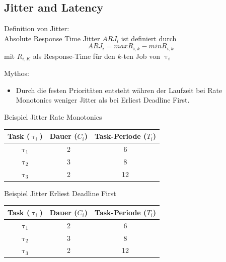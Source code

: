 

\subsection{Jitter and Latency}\label{JitterandLatency}

\begin{frame}{\subsecname}
	Definition von Jitter:\\
	Absolute Response Time Jitter $ARJ_i$ ist definiert durch
	\begin{equation}
		ARJ_i=max R_{i,k}-min R_{i,k}
	\end{equation} mit
	$R_{i,K}$ als Response-Time für den $k$-ten Job von $\uptau_i$
\end{frame}

\begin{frame}{\subsecname}
	Mythos:
	\begin{itemize}
		\item Durch die festen Prioritäten entsteht währen der Laufzeit bei Rate Monotonics weniger Jitter als bei Erliest Deadline First. 
	\end{itemize}
\end{frame}

\newcommand{\showRMSlideJit}[1] {\begin{frame}{Beispiel Jitter Rate Monotonics}
		\begin{center}
		\begin{tabular}{c||c|c}
			Task ($\uptau_i$) & Dauer ($C_i$) & Task-Periode ($T_i$)\\\hline\hline
			$\uptau_1$ & 2 & 6\\
			$\uptau_2$ & 3 & 8\\
			$\uptau_3$ & 2 & 12
		\end{tabular}
	\end{center}
	
\end{frame}}

%
{%
	\showRMSlideJit{\arabic{ct}}
}

\begin{frame}{Beispiel Jitter Erliest Deadline First}
		\begin{center}
		\begin{tabular}{c||c|c}
			Task ($\uptau_i$) & Dauer ($C_i$) & Task-Periode ($T_i$)\\\hline\hline
			$\uptau_1$ & 2 & 6\\
			$\uptau_2$ & 3 & 8\\
			$\uptau_3$ & 2 & 12
		\end{tabular}
	\end{center}
	
\end{frame}

